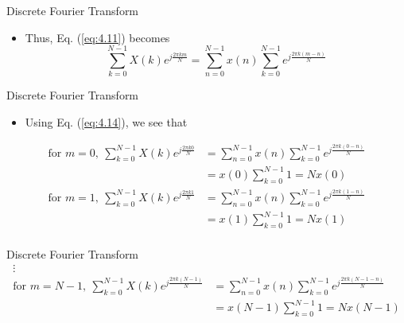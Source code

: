 \documentclass[pdflatex,compress,mathserif]{beamer}
\begin{document}
\begin{frame}{Discrete Fourier Transform}
    \begin{itemize}
        \item Thus, Eq. (\ref{eq:4.11}) becomes
        \begin{equation}
            \sum_{k=0}^{N-1} X(k)e^{j\frac{2\pi km}{N}} = \sum_{n=0}^{N-1} x(n) \sum_{k=0}^{N-1} e^{j\frac{2\pi k(m-n)}{N}}
            \label{eq:4.14}
        \end{equation}
    \end{itemize}
\end{frame}

\begin{frame}{Discrete Fourier Transform}
    \begin{itemize}
        \item Using Eq. (\ref{eq:4.14}), we see that
    \end{itemize}
    \begin{align*}
        \text{for } m = 0,~\sum_{k=0}^{N-1} X(k)e^{j\frac{2\pi k0}{N}} &= \sum_{n=0}^{N-1} x(n) \sum_{k=0}^{N-1} e^{j\frac{2\pi k(0-n)}{N}} \\
        &= x(0)\sum_{k=0}^{N-1}1 = Nx(0) \\
        \text{for } m = 1,~\sum_{k=0}^{N-1} X(k)e^{j\frac{2\pi k1}{N}} &= \sum_{n=0}^{N-1} x(n) \sum_{k=0}^{N-1} e^{j\frac{2\pi k(1-n)}{N}} \\
        &= x(1)\sum_{k=0}^{N-1}1 = Nx(1) \\
    \end{align*}
\end{frame}

\begin{frame}{Discrete Fourier Transform}
    \begin{align*}
        \vdots\\
        \text{for } m = N-1,~\sum_{k=0}^{N-1} X(k)e^{j\frac{2\pi k(N-1)}{N}} &= \sum_{n=0}^{N-1} x(n) \sum_{k=0}^{N-1} e^{j\frac{2\pi k(N-1-n)}{N}} \\
        &= x(N-1)\sum_{k=0}^{N-1}1 = Nx(N-1) \\
    \end{align*}
\end{frame}
\end{document}
